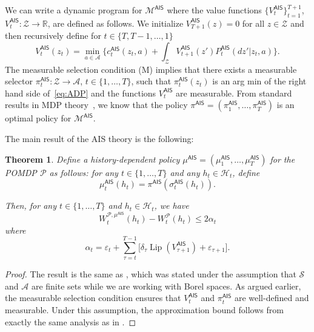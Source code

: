 \documentclass[letterpaper, 10pt]{IEEEtran}
\theoremstyle{plain}
\newtheorem{theorem}{Theorem}
\theoremstyle{nonumberplain}
\newtheorem{proof}{Proof}
\theoremstyle{plain}
\newcommand*\ALPHABET{\mathcal}
\newcommand*\reals{\mathds{R}}
\DeclareMathOperator{\Lip}{Lip}
\newcommand*\AIS{\mathsf{AIS}}
\begin{document}
We can  write a dynamic program for $\ALPHABET M^{\AIS}$  where the value functions $\{V^{\AIS}_t\}_{t=1}^{T+1}$, $V^{\AIS}_t \colon \ALPHABET Z \to \reals$, are defined as follows.
We initialize $V^{\AIS}_{T+1}(z) = 0$ for all $z \in \ALPHABET Z$ and then recursively define
for $t \in \{T, T-1,\dots, 1\}$
\begin{equation}\label{eq:ADP}
   V^{\AIS}_t(z_t) = \min_{a \in \ALPHABET A} \biggl\{
   c^{\AIS}_t(z_t, a) + \int_{\ALPHABET Z}V^{\AIS}_{t+1}(z') P^{\AIS}_t(dz'|z_t,a) 
   \biggr\}.
\end{equation}
The measurable selection condition (M) implies that there exists a measurable selector $\pi^{\AIS}_t \colon \ALPHABET Z \to \ALPHABET A$, $t \in \{1, \dots, T\}$, such that $\pi^{\AIS}_t(z_t)$ is an arg min of the right hand side of~\eqref{eq:ADP} and the functions $V^{\AIS}_t$ are measurable. From standard results in MDP theory~\cite{hernandez2012discrete}, we know that the policy $\pi^{\AIS} = (\pi^{\AIS}_1, \dots, \pi^{\AIS}_T)$ is an optimal policy for $\ALPHABET M^{\AIS}$.

The main result of the AIS theory is the following:
\begin{theorem}\label{thm:AIS}
   Define a history-dependent policy $\mu^{\AIS} = (\mu^{\AIS}_1, \dots, \mu^{\AIS}_T)$ for the POMDP $\ALPHABET P$ as follows: for any $t \in \{1, \dots, T\}$ and any $h_t \in \ALPHABET H_t$, define
   \[
   \mu^{\AIS}_t(h_t) = \pi^{\AIS}(\sigma^{\AIS}_t(h_t)).
   \]

   Then, for any $t \in \{1, \dots, T\}$ and $h_t \in \ALPHABET H_t$, we have
   \begin{equation}
       W^{\ALPHABET P, \mu^{\AIS}}_t(h_t) - W^{\ALPHABET{P}}_t(h_t) \le 2 \alpha_t
   \end{equation}
   where
   \[
       \alpha_t = \varepsilon_t + \sum_{\tau = t}^{T-1}\bigl[ \delta_{\tau} \Lip(V^{\AIS}_{\tau+1}) + \varepsilon_{\tau+1} \bigr].
   \]
\end{theorem}
\begin{proof}
   The result is the same as \cite[Theorem 9]{AIS}, which was stated under the assumption that $\ALPHABET S$ and $\ALPHABET A$ are finite sets while we are working with Borel spaces. As argued earlier, the measurable selection condition ensures that $V^{\AIS}_t$ and $\pi^{\AIS}_t$ are well-defined and measurable. Under this assumption, the approximation bound follows from exactly the same analysis as in \cite[Theorem 9]{AIS}.
\end{proof}
\end{document}
